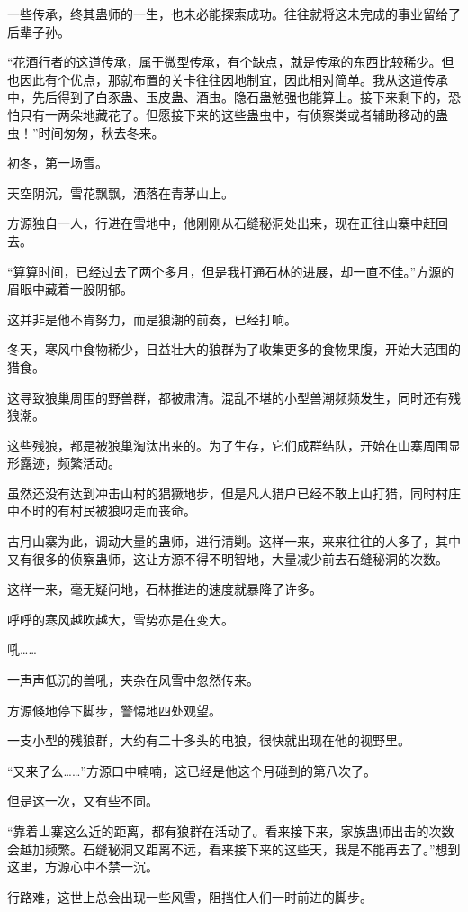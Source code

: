 \begin{this_body}
一些传承，终其蛊师的一生，也未必能探索成功。往往就将这未完成的事业留给了后辈子孙。

“花酒行者的这道传承，属于微型传承，有个缺点，就是传承的东西比较稀少。但也因此有个优点，那就布置的关卡往往因地制宜，因此相对简单。我从这道传承中，先后得到了白豕蛊、玉皮蛊、酒虫。隐石蛊勉强也能算上。接下来剩下的，恐怕只有一两朵地藏花了。但愿接下来的这些蛊虫中，有侦察类或者辅助移动的蛊虫！”时间匆匆，秋去冬来。

初冬，第一场雪。

天空阴沉，雪花飘飘，洒落在青茅山上。

方源独自一人，行进在雪地中，他刚刚从石缝秘洞处出来，现在正往山寨中赶回去。

“算算时间，已经过去了两个多月，但是我打通石林的进展，却一直不佳。”方源的眉眼中藏着一股阴郁。

这并非是他不肯努力，而是狼潮的前奏，已经打响。

冬天，寒风中食物稀少，日益壮大的狼群为了收集更多的食物果腹，开始大范围的猎食。

这导致狼巢周围的野兽群，都被肃清。混乱不堪的小型兽潮频频发生，同时还有残狼潮。

这些残狼，都是被狼巢淘汰出来的。为了生存，它们成群结队，开始在山寨周围显形露迹，频繁活动。

虽然还没有达到冲击山村的猖獗地步，但是凡人猎户已经不敢上山打猎，同时村庄中不时的有村民被狼叼走而丧命。

古月山寨为此，调动大量的蛊师，进行清剿。这样一来，来来往往的人多了，其中又有很多的侦察蛊师，这让方源不得不明智地，大量减少前去石缝秘洞的次数。

这样一来，毫无疑问地，石林推进的速度就暴降了许多。

呼呼的寒风越吹越大，雪势亦是在变大。

吼……

一声声低沉的兽吼，夹杂在风雪中忽然传来。

方源倏地停下脚步，警惕地四处观望。

一支小型的残狼群，大约有二十多头的电狼，很快就出现在他的视野里。

“又来了么……”方源口中喃喃，这已经是他这个月碰到的第八次了。

但是这一次，又有些不同。

“靠着山寨这么近的距离，都有狼群在活动了。看来接下来，家族蛊师出击的次数会越加频繁。石缝秘洞又距离不远，看来接下来的这些天，我是不能再去了。”想到这里，方源心中不禁一沉。

行路难，这世上总会出现一些风雪，阻挡住人们一时前进的脚步。


\end{this_body}
